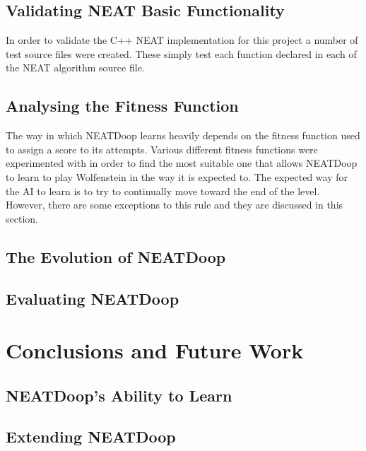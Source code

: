 \documentclass[]{Learning-to-Play-Wolfenstein-thesis}
\begin{document}
\section{Validating NEAT Basic Functionality}
In order to validate the C++ NEAT implementation for this project a number of test source files were created. These simply test each function declared in each of the NEAT algorithm source file.

\section{Analysing the Fitness Function}
The way in which NEATDoop learns heavily depends on the fitness function used to assign a score to its attempts. Various different fitness functions were experimented with in order to find the most suitable one that allows NEATDoop to learn to play Wolfenstein in the way it is expected to. The expected way for the AI to learn is to try to continually move toward the end of the level. However, there are some exceptions to this rule and they are discussed in this section.

\section{The Evolution of NEATDoop}


\section{Evaluating NEATDoop}		%

\chapter{Conclusions and Future Work}%
\section{NEATDoop's Ability to Learn}
\section{Extending NEATDoop}
\end{document}
